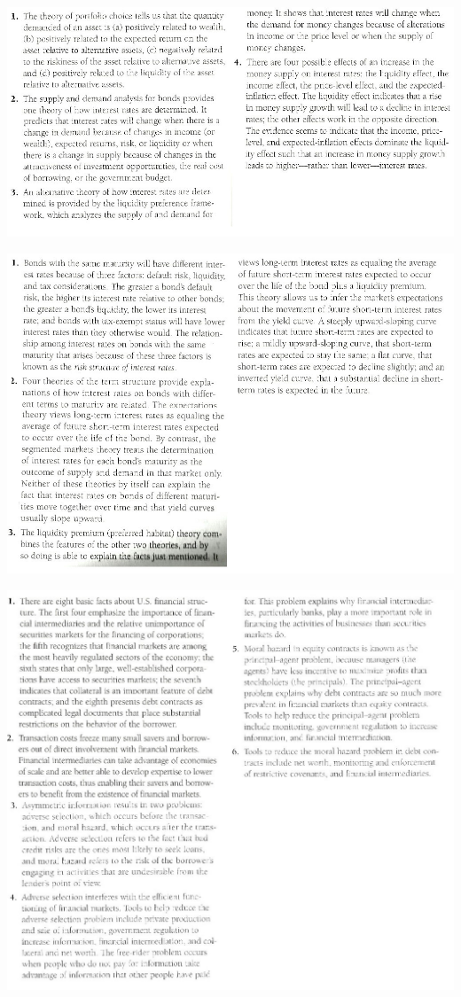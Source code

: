 \documentclass[12pt]{examnotes}
\begin{document}
\includegraphics[scale=0.5]{./imgs/sum5.jpg}

\includegraphics[scale=0.5]{./imgs/sum6.jpg}

\includegraphics[scale=0.5]{./imgs/sum8.jpg}
\end{document}
